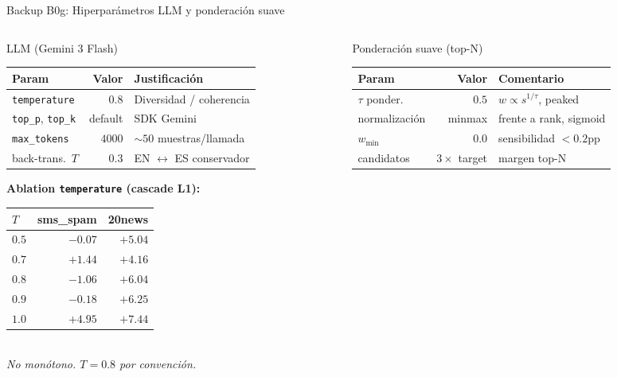 \begin{frame}{Backup B0g: Hiperparámetros LLM y ponderación suave}
\scriptsize
\begin{columns}[T]

\begin{column}{0.50\textwidth}
\begin{block}{LLM (Gemini 3 Flash)}
\scriptsize
\begin{tabular}{@{}lrl@{}}
\toprule
Param         & Valor & Justificación \\
\midrule
\texttt{temperature}      & $0.8$  & Diversidad / coherencia \\
\texttt{top\_p}, \texttt{top\_k} & default & SDK Gemini \\
\texttt{max\_tokens}      & $4000$ & $\sim 50$ muestras/llamada \\
back-trans.\ $T$          & $0.3$  & EN $\leftrightarrow$ ES conservador \\
\bottomrule
\end{tabular}

\vspace{0.3em}
\textbf{Ablation \texttt{temperature} (cascade L1):}\\[2pt]
\begin{tabular}{@{}lrr@{}}
\toprule
$T$ & sms\_spam & 20news \\
\midrule
$0.5$ & $-0.07$ & $+5.04$ \\
$0.7$ & $+1.44$ & $+4.16$ \\
$0.8$ & $-1.06$ & $+6.04$ \\
$0.9$ & $-0.18$ & $+6.25$ \\
$1.0$ & $+4.95$ & $+7.44$ \\
\bottomrule
\end{tabular}\\
{\itshape No monótono. $T{=}0.8$ por convención.}
\end{block}
\end{column}

\begin{column}{0.50\textwidth}
\begin{block}{Ponderación suave (top-N)}
\scriptsize
\begin{tabular}{@{}lrl@{}}
\toprule
Param            & Valor    & Comentario \\
\midrule
$\tau$ ponder.   & $0.5$    & $w \propto s^{1/\tau}$, peaked \\
normalización    & minmax   & frente a rank, sigmoid \\
$w_{\min}$       & $0.0$    & sensibilidad $<\!0.2$pp \\
candidatos       & $3\times$ target & margen top-N \\
\bottomrule
\end{tabular}


\end{block}
\end{column}
\end{columns}
\end{frame}
